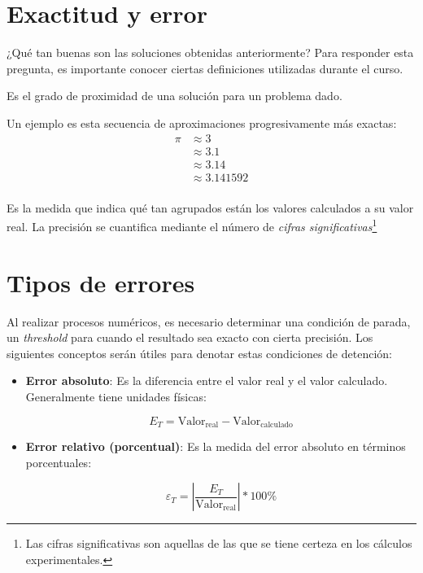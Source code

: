 \section{Exactitud y error}

¿Qué tan buenas son las soluciones obtenidas anteriormente? Para
responder esta pregunta, es importante conocer ciertas definiciones
utilizadas durante el curso.

\begin{definition}[Exactitud]
    Es el grado de proximidad de una solución para un problema dado.


\end{definition}

\begin{eg}
    Un ejemplo es esta secuencia de aproximaciones progresivamente más exactas:
    \begin{align*} 
        \pi &\approx 3 \\ 
            &\approx 3.1 \\ 
            &\approx 3.14 \\ 
            &\approx 3.141592 \\ 
    \end{align*}

\end{eg}

\begin{definition}[Precisión]
    Es la medida que indica qué tan agrupados están los valores calculados a
    su valor real. La precisión se cuantifica mediante el número de
    \emph{cifras significativas}\footnote{Las cifras significativas son
    aquellas de las que se tiene certeza en los cálculos experimentales.}
\end{definition}


\section{Tipos de errores}

Al realizar procesos numéricos, es necesario determinar una condición de
parada, un \emph{threshold} para cuando el resultado sea exacto con
cierta precisión. Los siguientes conceptos serán útiles para denotar
estas condiciones de detención:

\begin{itemize}
    \item
        \textbf{Error absoluto}: Es la diferencia entre el valor real y el
        valor calculado. Generalmente tiene unidades físicas:

        \begin{equation*}{
                E_T = \text{Valor}_{\text{real}} - \text{Valor}_{\text{calculado}}
        }\end{equation*}
    \item
        \textbf{Error relativo (porcentual)}: Es la medida del error absoluto
        en términos porcentuales:

        \begin{equation*}{
                \varepsilon_{T} = \left| {\frac{E_T}{\text{Valor}_{\text{real}}}} \right| * 100 \%
        }\end{equation*}
\end{itemize}


